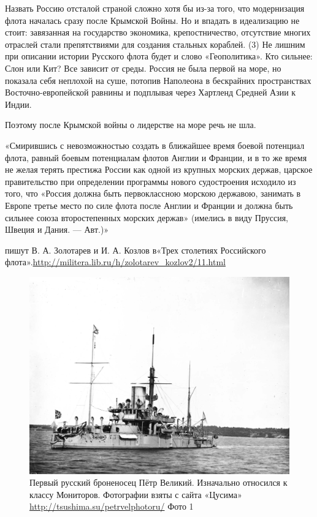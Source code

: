 Назвать Россию отсталой страной сложно хотя бы из-за того, что модернизация флота началась сразу после Крымской Войны. Но и впадать в идеализацию не стоит: завязанная на государство экономика, крепостничество, отсутствие многих отраслей стали препятствиями для создания стальных кораблей. (3)
Не лишним при описании истории Русского флота будет и слово «Геополитика». Кто сильнее: Слон или Кит? Все зависит от среды. Россия не была первой на море, но показала себя неплохой на суше, потопив Наполеона в бескрайних пространствах Восточно-европейской равнины и подплывая через Хартленд Средней Азии к Индии.


Поэтому после Крымской войны о лидерстве на море речь не шла.
\begin{textcitation}
{	
		«Смирившись с невозможностью создать в ближайшее время боевой потенциал флота, равный боевым потенциалам флотов Англии и Франции, и в то же время не желая терять престижа России как одной из крупных морских держав, царское правительство при определении программы нового судостроения исходило из того, что «Россия должна быть первоклассною морскою державою, занимать в Европе третье место по силе флота после Англии и Франции и должна быть сильнее союза второстепенных морских держав» (имелись в виду Пруссия, Швеция и Дания. — Авт.)»}
\end{textcitation} 
пишут В. А. Золотарев и И. А. Козлов в«Трех столетиях Российского флота».\url{http://militera.lib.ru/h/zolotarev_kozlov2/11.html}

\begin{figure}[h!tb] 
	\centering\includegraphics[scale=0.2]{Data/RYAV_sily_storon/jYR7YIwi8uE.jpg}
	\caption{Первый русский броненосец Пётр Великий. Изначально относился к классу Мониторов. Фотографии взяты с сайта «Цусима» \url{http://tsushima.su/petrvelphotoru/} Фото 1}%
\end{figure}


